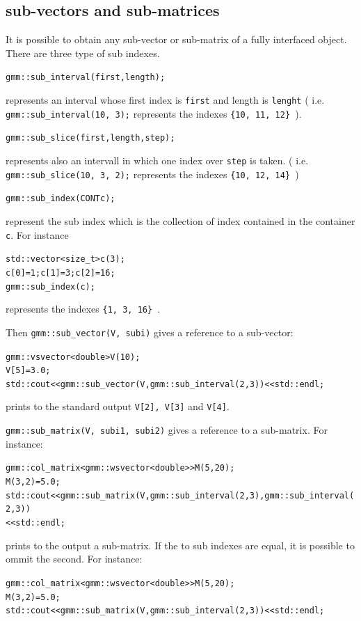 \documentclass[11pt,a4paper]{article}
\begin{document}
\subsection{sub-vectors and sub-matrices}
It is possible to obtain any sub-vector or sub-matrix of a fully interfaced object. There are three type of sub indexes.
\begin{alltt}
  gmm::sub_interval(first, length);
\end{alltt}
represents an interval whose first index is {\tt first} and length is {\tt lenght} ( i.e. {\tt gmm::sub_interval(10, 3);} represents the indexes {\tt \{10, 11, 12\} }).
\begin{alltt}
  gmm::sub_slice(first, length, step);
\end{alltt}
represents also an intervall in which one index over {\tt step} is taken. ( i.e. {\tt gmm::sub_slice(10, 3, 2);} represents the indexes {\tt \{10, 12, 14\} })
\begin{alltt}
  gmm::sub_index(CONT c);
\end{alltt}
represent the sub index which is the collection of index contained in the container {\tt c}. For instance
\begin{alltt}
  std::vector<size_t> c(3);
  c[0] = 1; c[1] = 3; c[2] = 16;
  gmm::sub_index(c);
\end{alltt}
represents the indexes {\tt \{1, 3, 16\} }.

Then {\tt gmm::sub_vector(V, subi)} gives a reference to a sub-vector:
\begin{alltt}
  gmm::vsvector<double> V(10);
  V[5] = 3.0;
  std::cout << gmm::sub_vector(V, gmm::sub_interval(2, 3)) << std::endl;  
\end{alltt}
prints to the standard output {\tt V[2], V[3]} and {\tt V[4]}.

{\tt gmm::sub_matrix(V, subi1, subi2)} gives a reference to a sub-matrix. For instance:
\begin{alltt}
  gmm::col_matrix< gmm::wsvector<double> > M(5, 20);
  M(3, 2) = 5.0;
  std::cout << gmm::sub_matrix(V, gmm::sub_interval(2, 3), gmm::sub_interval(2, 3))
            << std::endl;  
\end{alltt}
prints to the output a sub-matrix. If the to sub indexes are equal, it is possible to ommit the second. For instance:
\begin{alltt}
  gmm::col_matrix< gmm::wsvector<double> > M(5, 20);
  M(3, 2) = 5.0;
  std::cout << gmm::sub_matrix(V, gmm::sub_interval(2, 3)) << std::endl;  
\end{alltt}
\end{document}
